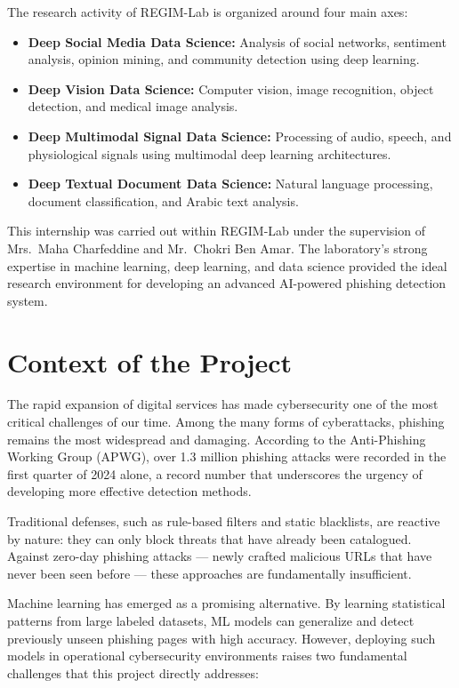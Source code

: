 The research activity of REGIM-Lab is organized around four main axes:
\begin{itemize}
    \item \textbf{Deep Social Media Data Science:} Analysis of social networks, sentiment analysis, opinion mining, and community detection using deep learning.
    \item \textbf{Deep Vision Data Science:} Computer vision, image recognition, object detection, and medical image analysis.
    \item \textbf{Deep Multimodal Signal Data Science:} Processing of audio, speech, and physiological signals using multimodal deep learning architectures.
    \item \textbf{Deep Textual Document Data Science:} Natural language processing, document classification, and Arabic text analysis.
\end{itemize}

This internship was carried out within REGIM-Lab under the supervision of Mrs.~Maha Charfeddine and Mr.~Chokri Ben Amar. The laboratory's strong expertise in machine learning, deep learning, and data science provided the ideal research environment for developing an advanced AI-powered phishing detection system.

\section{Context of the Project}

The rapid expansion of digital services has made cybersecurity one of the most critical challenges of our time. Among the many forms of cyberattacks, phishing remains the most widespread and damaging. According to the Anti-Phishing Working Group (APWG), over 1.3 million phishing attacks were recorded in the first quarter of 2024 alone, a record number that underscores the urgency of developing more effective detection methods.

Traditional defenses, such as rule-based filters and static blacklists, are reactive by nature: they can only block threats that have already been catalogued. Against zero-day phishing attacks — newly crafted malicious URLs that have never been seen before — these approaches are fundamentally insufficient.

Machine learning has emerged as a promising alternative. By learning statistical patterns from large labeled datasets, ML models can generalize and detect previously unseen phishing pages with high accuracy. However, deploying such models in operational cybersecurity environments raises two fundamental challenges that this project directly addresses:

